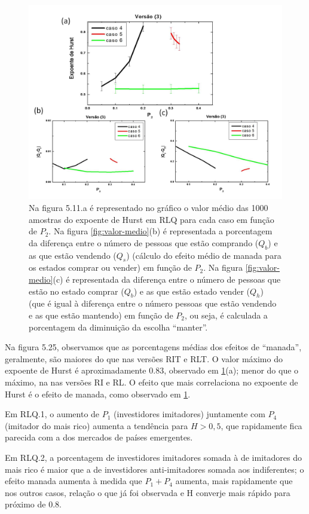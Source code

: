 \documentclass[brazil,ruledheader]{abnt}
\begin{document}
\begin{figure}[!h]
\centering
\includegraphics[width=0.8\linewidth]{Figuras/25.jpg}
\caption[Análise do expoente de Hurst em RLQ]{Na figura 5.11.a é representado
no
gráfico o valor médio das 1000 amostras do expoente de Hurst em RLQ para cada
caso em função de $P_2$.
Na figura \ref{fig:valor-medio}(b) é representada a porcentagem da diferença
entre o número de pessoas que estão comprando ($Q_b$) e as que estão vendendo
($Q_s$) (cálculo do efeito médio de manada para os estados comprar ou vender)
em função de $P_2$. Na figura \ref{fig:valor-medio}(c) é representada da
diferença entre o número de pessoas que estão no estado comprar ($Q_b$) e as que
estão estado vender ($Q_h$) (que é igual à diferença entre o número pessoas que
estão vendendo e as que estão mantendo) em função de $P_2$, ou seja, é calculada
a porcentagem da diminuição da escolha ``manter''.}
\label{fig:grafico3}
\end{figure}

Na figura 5.25, observamos que as porcentagens médias dos efeitos de
“manada”, geralmente, são maiores do que nas versões RIT e RLT. O valor máximo
do
expoente de Hurst é aproximadamente 0.83, observado em \ref{fig:grafico3}(a);
menor do que o máximo, na nas versões RI e RL. O efeito que mais correlaciona no
expoente de Hurst é o efeito de manada, como observado em \ref{fig:grafico3}. 


Em RLQ.1, o aumento de $P_1$ (investidores imitadores) juntamente com $P_4$
(imitador do mais rico) aumenta a tendência para $H>0,5$, que rapidamente fica
parecida com a dos mercados de países emergentes. 

Em RLQ.2,  a porcentagem de investidores imitadores somada à de 
imitadores do mais rico é maior que a de investidores anti-imitadores somada
aos indiferentes; o efeito manada aumenta à medida que $P_1+P_4$ aumenta, mais
rapidamente que nos outros casos, relação o que já foi observada e H converje
mais rápido para próximo de 0.8.  
\end{document}
